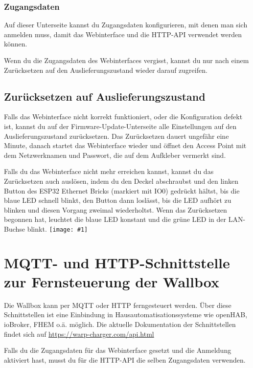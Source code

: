\documentclass[a4paper,10pt]{article}
\newcommand{\hint}[1]{\begin{tcolorbox}[colback=boxgray,colframe=black,coltext=
white,title=Hinweis]#1\end{tcolorbox}}
\newcommand{\gfx}[1]{\texttt{[image: \#1]}}
\begin{document}
\begin{multicols*}{2}
	\subsubsection{Zugangsdaten}
	Auf dieser Unterseite kannst du Zugangsdaten konfigurieren, mit denen man sich anmelden muss,
	damit das Webinterface und die HTTP-API verwendet werden können.

	\hint{Wenn du die Zugangsdaten des Webinterfaces vergisst, kannst du nur nach einem Zurücksetzen
	auf den Auslieferungszustand wieder darauf zugreifen.}

	\vfill
	\subsection{Zurücksetzen auf Auslieferungszustand}\label{reset}
	Falls das Webinterface nicht korrekt funktioniert, oder die Konfiguration defekt ist,
	kannst du auf der Firmware-Update-Unterseite alle Einstellungen auf den Auslieferungszustand zurücksetzen.
	Das Zurücksetzen dauert ungefähr eine Minute, danach startet das Webinterface wieder und öffnet
	den Access Point mit dem Netzwerknamen und Passwort, die auf dem Aufkleber vermerkt sind.

	Falls du das Webinterface nicht mehr erreichen kannst, kannst du das Zurücksetzen auch
	auslösen, indem du den Deckel abschraubst und den linken Button des ESP32 Ethernet Bricks (markiert mit IO0)
	gedrückt hältst, bis die blaue LED schnell blinkt, den Button dann loslässt, bis die LED aufhört zu blinken und
	diesen Vorgang zweimal wiederholtst. Wenn das Zurücksetzen begonnen hat, leuchtet die blaue LED konstant und
	die grüne LED in der LAN-Buchse blinkt.
	\gfx{./img_warp2/resized/warp_esp_open_small}
	\newpage
	\section{MQTT- und HTTP-Schnittstelle zur Fernsteuerung der Wallbox}
	Die Wallbox kann per MQTT oder HTTP ferngesteuert werden. Über diese Schnittstellen ist eine
	Einbindung in Hausautomatisationssysteme wie openHAB, ioBroker, FHEM o.ä. möglich. Die aktuelle
	Dokumentation der Schnittstellen findet sich auf \url{https://warp-charger.com/api.html}

	Falls du die Zugangsdaten für das Webinterface gesetzt und die Anmeldung aktiviert hast, musst du
	für die HTTP-API die selben Zugangsdaten verwenden.


\end{multicols*}
\end{document}
